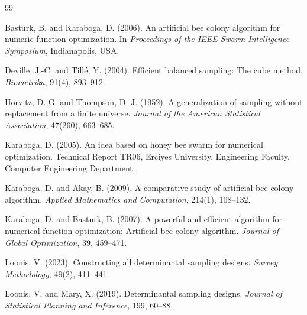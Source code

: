 \documentclass[12pt]{article}
\begin{document}
\begin{thebibliography}{99}

Basturk, B. and Karaboga, D. (2006).
An artificial bee colony algorithm for numeric function optimization.
In \emph{Proceedings of the IEEE Swarm Intelligence Symposium}, Indianapolis, USA.

Deville, J.-C. and Till\'{e}, Y. (2004).
Efficient balanced sampling: The cube method.
\emph{Biometrika}, 91(4), 893--912.

Horvitz, D. G. and Thompson, D. J. (1952).
A generalization of sampling without replacement from a finite universe.
\emph{Journal of the American Statistical Association}, 47(260), 663--685.

Karaboga, D. (2005).
An idea based on honey bee swarm for numerical optimization.
Technical Report TR06, Erciyes University, Engineering Faculty, Computer Engineering Department.

Karaboga, D. and Akay, B. (2009).
A comparative study of artificial bee colony algorithm.
\emph{Applied Mathematics and Computation}, 214(1), 108--132.

Karaboga, D. and Basturk, B. (2007).
A powerful and efficient algorithm for numerical function optimization: Artificial bee colony algorithm.
\emph{Journal of Global Optimization}, 39, 459--471.

Loonis, V. (2023).
Constructing all determinantal sampling designs.
\emph{Survey Methodology}, 49(2), 411--441.

Loonis, V. and Mary, X. (2019).
Determinantal sampling designs.
\emph{Journal of Statistical Planning and Inference}, 199, 60--88.

\end{thebibliography}
\end{document}
